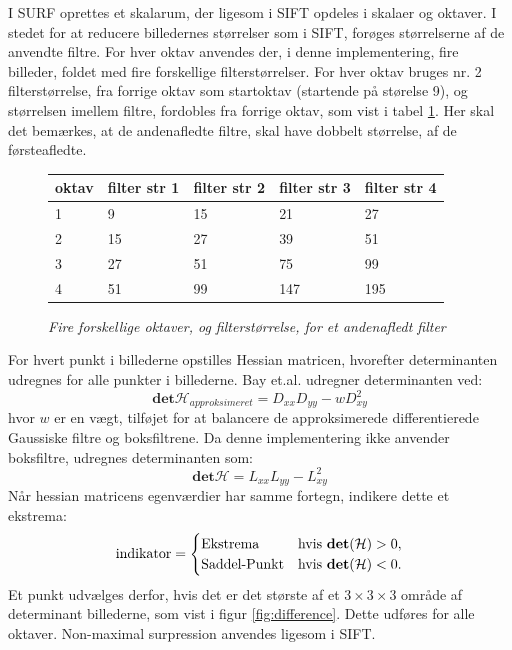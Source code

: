 I SURF oprettes et skalarum, der ligesom i SIFT opdeles i skalaer og oktaver. I stedet for at reducere billedernes størrelser som i SIFT, forøges størrelserne af de anvendte filtre. For hver oktav anvendes der, i denne implementering, fire billeder, foldet med fire forskellige filterstørrelser. For hver oktav bruges nr. 2 filterstørrelse, fra forrige oktav som startoktav (startende på størelse 9), og størrelsen imellem filtre, fordobles fra forrige oktav, som vist i tabel \ref{fig:secderivfiltersize}. Her skal det bemærkes, at de andenafledte filtre, skal have dobbelt størrelse, af de førsteafledte.
\begin{figure}[H]
    \centering
    \begin{center}    
    \begin{tabular}{ | l | l | l | l | l |}
    \hline
    oktav & filter str 1 & filter str 2 & filter str 3 & filter str 4 \\ \hline
    1 & 9 & 15 & 21 & 27 \\ \hline
  	2 & 15 & 27 & 39 & 51 \\ \hline
  	3 & 27 & 51 & 75 & 99 \\ \hline
  	4 & 51 & 99 & 147 & 195 \\ \hline
    \end{tabular}       
    \caption{{\footnotesize \textit{Fire forskellige oktaver, og filterstørrelse, for et andenafledt filter}}}
    \label{fig:secderivfiltersize}
     \end{center}
     \vspace{-2.5em}
  \end{figure} \noindent
For hvert punkt i billederne opstilles Hessian matricen, hvorefter determinanten udregnes for alle punkter i billederne. Bay et.al. udregner determinanten ved:
\begin{equation}
\textbf{det}\mathcal{H}_{approksimeret} = D_{xx}D_{yy}-wD_{xy}^2
\label{deerminantofhessian}
\end{equation}
hvor $w$ er en vægt, tilføjet for at balancere de approksimerede differentierede Gaussiske filtre og boksfiltrene. Da denne implementering ikke anvender boksfiltre, udregnes determinanten som:
\begin{equation}
\textbf{det}\mathcal{H} = L_{xx}L_{yy}-L_{xy}^2
\label{deerminantofhessian}
\end{equation}
Når hessian matricens egenværdier har samme fortegn, indikere dette et ekstrema:
\begin{equation}
\begin{split}
\text{indikator} = 
\begin{cases}
\text{Ekstrema}& \text{hvis } \bold{det}(\mathcal{H}) > 0,  \\
\text{Saddel-Punkt} & \text{hvis } \bold{det}(\mathcal{H}) < 0.
\end{cases}
\end{split}
\label{detman}
\end{equation}
Et punkt udvælges derfor, hvis det er det største af et $3\times3\times3$ område af determinant billederne, som vist i figur \ref{fig:difference}. Dette udføres for alle oktaver. Non-maximal surpression anvendes ligesom i SIFT.
